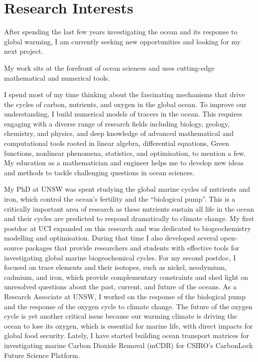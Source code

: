 \section{Research Interests}

After spending the last few years investigating the ocean and its response to global warming, I am currently seeking new opportunities and looking for my next project.



My work sits at the forefront of ocean sciences and uses cutting-edge mathematical and numerical tools.

I spend most of my time thinking about the fascinating mechanisms that drive the cycles of carbon, nutrients, and oxygen in the global ocean.
To improve our understanding, I build numerical models of tracers in the ocean.
This requires engaging with a diverse range of research fields including biology, geology, chemistry, and physics, and deep knowledge of advanced mathematical and computational tools rooted in linear algebra, differential equations, Green functions, nonlinear phenomena, statistics, and optimisation, to mention a few.
My education as a mathematician and engineer helps me to develop new ideas and methods to tackle challenging questions in ocean sciences.


My PhD at UNSW was spent studying the global marine cycles of nutrients and iron, which control the ocean's fertility and the ``biological pump''.
This is a critically important area of research as these nutrients sustain all life in the ocean and their cycles are predicted to respond dramatically to climate change.
My first postdoc at UCI expanded on this research and was dedicated to biogeochemistry modelling and optimisation.
During that time I also developed several open-source packages that provide researchers and students with effective tools for investigating global marine biogeochemical cycles.
For my second postdoc, I focused on trace elements and their isotopes, such as nickel, neodymium, cadmium, and iron, which provide complementary constraints and shed light on unresolved questions about the past, current, and future of the oceans.
As a Research Associate at UNSW, I worked on the response of the biological pump and the response of the oxygen cycle to climate change.
The future of the oxygen cycle is yet another critical issue because our warming climate is driving the ocean to lose its oxygen, which is essential for marine life, with direct impacts for global food security.
Lately, I have started building ocean transport matrices for investigating marine Carbon Dioxide Removal (mCDR) for CSIRO's CarbonLock Future Science Platform.


